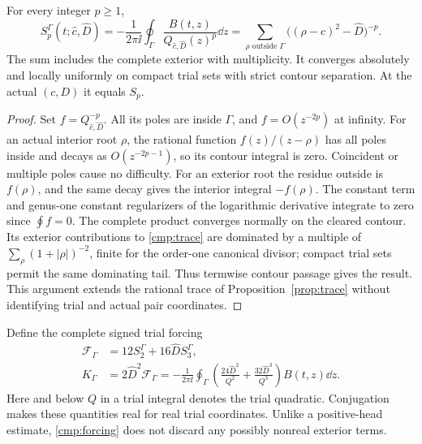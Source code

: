 \begin{proposition}
\label{cmp:trial}
For every integer $p\ge1$,
\begin{equation}
 S_p^\Gamma(t;\widehat c,\widehat D)
 =-\frac1{2\pi\ii}\oint_\Gamma
       \frac{B(t,z)}{Q_{\!\widehat c,\widehat D}(z)^p}\dd z
 =\sum_{\rho\text{ outside }\Gamma}
       \bigl((\rho-\widehat c)^2-\widehat D\bigr)^{-p}.
 \label{cmp:trace}
\end{equation}
The sum includes the complete exterior with multiplicity. It converges
absolutely and locally uniformly on compact trial sets with strict
contour separation. At the actual $(c,D)$ it equals $S_p$.
\end{proposition}
\begin{proof}
Set $f=Q_{\!\widehat c,\widehat D}^{-p}$. All its poles are inside
$\Gamma$, and $f=O(z^{-2p})$ at infinity. For an actual interior root
$\rho$, the rational function $f(z)/(z-\rho)$ has all poles inside and
decays as $O(z^{-2p-1})$, so its contour integral is zero. Coincident or
multiple poles cause no difficulty. For an exterior root the residue
outside is $f(\rho)$, and the same decay gives the interior integral
$-f(\rho)$. The constant term and genus-one constant regularizers of the
logarithmic derivative integrate to zero since $\oint f=0$.
The complete product converges normally on the cleared contour. Its
exterior contributions to \eqref{cmp:trace} are dominated by a multiple
of $\sum_\rho(1+|\rho|)^{-2}$, finite for the order-one canonical divisor;
compact trial sets permit the same dominating tail. Thus termwise
contour passage gives the result. This argument extends the rational
trace of Proposition~\ref{prop:trace} without identifying trial and actual
pair coordinates.
\end{proof}

Define the complete signed trial forcing
\begin{equation}
 \begin{split}
 \mathcal F_\Gamma&=12S_2^\Gamma+16\widehat D S_3^\Gamma,\\
 K_\Gamma&=2\widehat D^2\mathcal F_\Gamma
 =-\frac1{2\pi\ii}\oint_\Gamma
 \left(\frac{24\widehat D^2}{Q^2}
       +\frac{32\widehat D^3}{Q^3}\right)B(t,z)\dd z .
 \end{split}
 \label{cmp:forcing}
\end{equation}
Here and below $Q$ in a trial integral denotes the trial quadratic.
Conjugation makes these quantities real for real trial coordinates.
Unlike a positive-head estimate, \eqref{cmp:forcing} does not discard
any possibly nonreal exterior terms.

